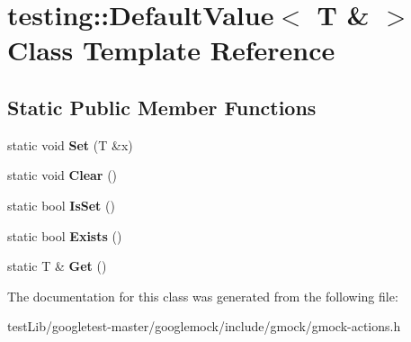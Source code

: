 \hypertarget{classtesting_1_1DefaultValue_3_01T_01_6_01_4}{}\section{testing\+:\+:Default\+Value$<$ T \& $>$ Class Template Reference}
\label{classtesting_1_1DefaultValue_3_01T_01_6_01_4}
\subsection*{Static Public Member Functions}
\begin{DoxyCompactItemize}
\item 
\mbox{\label{classtesting_1_1DefaultValue_3_01T_01_6_01_4_a9863abf3d311ce5007d7e57dfce2f252}} 
static void {\bfseries Set} (T \&x)
\item 
\mbox{\label{classtesting_1_1DefaultValue_3_01T_01_6_01_4_a3c8f9f81e591370f9b33798f58ca1a10}} 
static void {\bfseries Clear} ()
\item 
\mbox{\label{classtesting_1_1DefaultValue_3_01T_01_6_01_4_a3e61547c2f0141cc8004385f3a9c817d}} 
static bool {\bfseries Is\+Set} ()
\item 
\mbox{\label{classtesting_1_1DefaultValue_3_01T_01_6_01_4_a38420499e17d2fb4146ae6c4265f0d55}} 
static bool {\bfseries Exists} ()
\item 
\mbox{\label{classtesting_1_1DefaultValue_3_01T_01_6_01_4_a1310448dd8c171aecfcbf7c8df5de7bd}} 
static T \& {\bfseries Get} ()
\end{DoxyCompactItemize}


The documentation for this class was generated from the following file\+:\begin{DoxyCompactItemize}
\item 
test\+Lib/googletest-\/master/googlemock/include/gmock/gmock-\/actions.\+h\end{DoxyCompactItemize}
